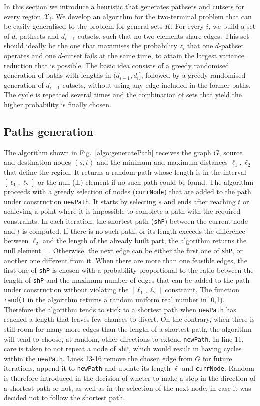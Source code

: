 \documentclass[a4paper]{article}
\newcommand{\ele}{{\ell}}
\begin{document}
In this section we introduce a heuristic that generates pathsets and cutsets for every region ${\mathcal X}_i$. We develop an algorithm for the two-terminal problem that can be easily generalised to the problem for general sets $K$. For every $i$, we build a set of $d_i$-pathsets and $d_{i-1}$-cutsets, such that no two elements share edges. This set should ideally be the one that maximises the probability $z_i$ that one $d$-pathset operates and one $d$-cutset fails at the same time, to attain the largest variance reduction that is possible. The basic idea consists of a greedy randomised generation of paths with lengths in $(d_{i-1}, d_i]$, followed by a greedy randomised generation of $d_{i-1}$-cutsets, without using any edge included in the former paths. The cycle is repeated several times and the combination of sets that yield the higher probability is finally chosen.

\subsection{Paths generation}

The algorithm shown in Fig.~\ref{algo:generatePath} receives the graph $G$, source and destination nodes $(s,t)$ and the minimum and maximum distances $\ele_1,\ele_2$ that define the region. It returns a random path whose length is in the interval $[\ele_1,\ele_2]$ or the null ($\bot$) element if no such path could be found. The algorithm proceeds with a greedy selection of nodes ({\tt currNode}) that are added to the path under construction {\tt newPath}. It starts by selecting $s$ and ends after reaching $t$ or achieving a point where it is impossible to complete a path with the required constraints. In each iteration, the shortest path ({\tt shP}) between the current node and $t$ is computed. If there is no such path, or its length exceeds the difference between $\ele_2$ and the length of the already built part, the algorithm returns the null element $\bot$. Otherwise, the next edge can be either the first one of {\tt shP}, or another one different from it. When there are more than one feasible edges, the first one of {\tt shP} is chosen with a probability proportional to the ratio between the length of {\tt shP} and the maximum number of edges that can be added to the path under construction without violating the $[\ele_1,\ele_2]$ constraint. The function {\tt rand()} in the algorithm returns a random uniform real number in [0,1). Therefore the algorithm tends to stick to a shortest path when {\tt newPath} has reached a length that leaves few chances to divert. On the contrary, when there is still room for many more edges than the length of a shortest path, the algorithm will tend to choose, at random, other directions to extend {\tt newPath}. In line 11, care is taken to not repeat a node of {\tt shP}, which would result in having cycles within the {\tt newPath}. Lines 13-16 remove the chosen edge from $G$ for future iterations, append it to {\tt newPath} and update its length $\ele$ and {\tt currNode}. Random is therefore introduced in the decision of wheter to make a step in the direction of a shortest path or not, as well as in the selection of the next node, in case it was decided not to follow the shortest path.
\end{document}
